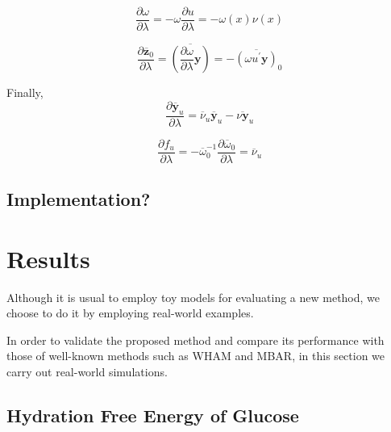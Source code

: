 \documentclass[journal=jctcce,manuscript=article,layout=twocolumn]{achemso}
\newcommand{\vt}[1]{\boldsymbol{\mathbf{#1}}}   %
\newcommand{\diff}[2]{\frac{\partial #1}{\partial #2}} %
\newcommand{\avg}[1]{\overline{#1}}             %
\begin{document}
\begin{equation*}
\diff{\omega}{\lambda} = -\omega \diff{u}{\lambda} = -\omega(x) \nu(x)
\end{equation*}


\begin{equation*}
\diff{\avg{\vt z}_0}{\lambda} = \avg{\left( \diff{\omega}{\lambda} \vt y \right)} = -\avg{(\omega u^\prime \vt y)}_0
\end{equation*}

Finally,
\begin{equation*}
\diff{\avg{\vt y}_u}{\lambda} = \avg{\nu}_u \avg{\vt y}_u - \avg{\nu \vt y}_u
\end{equation*}


\begin{equation*}
\diff{f_u}{\lambda} = -\avg{\omega}_0^{-1} \diff{\avg{\omega}_0}{\lambda} = \avg{\nu}_u
\end{equation*}

\subsection{Implementation?}


\section{Results}

Although it is usual to employ toy models for evaluating a new method, we choose to do it by employing real-world examples.

In order to validate the proposed method and compare its performance with those of well-known methods such as WHAM and MBAR, in this section we carry out real-world simulations.

\subsection{Hydration Free Energy of Glucose}
\end{document}

